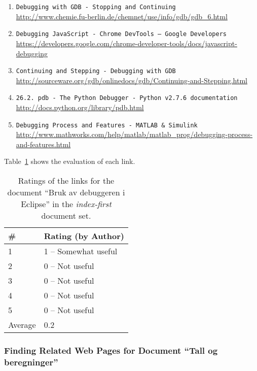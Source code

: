 \begin{enumerate}
\item
    \verb|Debugging with GDB - Stopping and Continuing| \\
    \url{http://www.chemie.fu-berlin.de/chemnet/use/info/gdb/gdb_6.html}
\item
    \verb|Debugging JavaScript - Chrome DevTools — Google Developers| \\
    \url{https://developers.google.com/chrome-developer-tools/docs/javascript-debugging}
\item
    \verb|Continuing and Stepping - Debugging with GDB| \\
    \url{http://sourceware.org/gdb/onlinedocs/gdb/Continuing-and-Stepping.html}
\item
    \verb|26.2. pdb - The Python Debugger - Python v2.7.6 documentation| \\
    \url{http://docs.python.org/library/pdb.html}
\item
    \verb|Debugging Process and Features - MATLAB & Simulink| \\
    \url{http://www.mathworks.com/help/matlab/matlab_prog/debugging-process-and-features.html}
\end{enumerate}

Table~\ref{tab:ratings-no-bruk-av-debuggeren-i-eclipse} shows the evaluation of each link.
\begin{table}[H]
\centering
\begin{tabular}{|l|l|}
\hline\hline
    \# & Rating (by Author) \\
\hline
    1 & 1 -- Somewhat useful \\
    2 & 0 -- Not useful \\
    3 & 0 -- Not useful \\
    4 & 0 -- Not useful \\
    5 & 0 -- Not useful \\
\hline
    Average & 0.2 \\
\hline\hline
\end{tabular}
\caption{Ratings of the links for the document ``Bruk av debuggeren i Eclipse'' in the \textit{index-first} document set.}
\label{tab:ratings-no-bruk-av-debuggeren-i-eclipse}
\end{table}


\subsubsection{Finding Related Web Pages for Document ``Tall og beregninger''}
\label{subsubsec:no-tall-og-beregninger}

